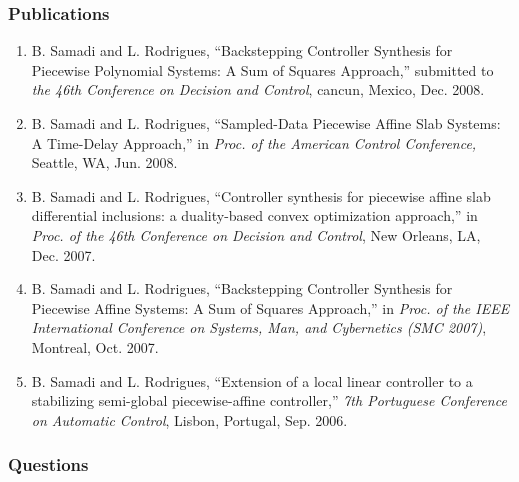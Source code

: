 \documentclass{beamer}
\begin{document}
  \frame
  {
    \frametitle{Publications}

\begin{enumerate}
\item {\scriptsize B. Samadi and L. Rodrigues, ``Backstepping Controller Synthesis for Piecewise Polynomial Systems: A Sum of Squares Approach,''  submitted to \emph{the 46th Conference on Decision and Control}, cancun, Mexico, Dec. 2008.}
\item {\scriptsize B. Samadi and L. Rodrigues, ``Sampled-Data Piecewise Affine Slab Systems: A Time-Delay Approach,'' in \emph{Proc. of the American Control Conference,} Seattle, WA, Jun. 2008.}
\item {\scriptsize B. Samadi and L. Rodrigues, ``Controller synthesis for piecewise affine slab differential inclusions: a duality-based convex optimization approach,'' in \emph{Proc. of the 46th Conference on Decision and Control}, New Orleans, LA, Dec. 2007.}
\item {\scriptsize B. Samadi and L. Rodrigues, ``Backstepping Controller Synthesis for Piecewise Affine Systems: A Sum of Squares Approach,'' in \emph{Proc. of the IEEE International Conference on Systems, Man, and Cybernetics (SMC 2007)}, Montreal, Oct. 2007. }
\item {\scriptsize B. Samadi and L. Rodrigues, ``Extension of a local linear controller to a stabilizing semi-global piecewise-affine controller,'' \emph{7th Portuguese Conference on Automatic Control}, Lisbon, Portugal, Sep. 2006.}
\end{enumerate} 
}

  \frame
  {
    \frametitle{Questions}
    \begin{center}
    \centerline{}
    \end{center}
}
\end{document}
